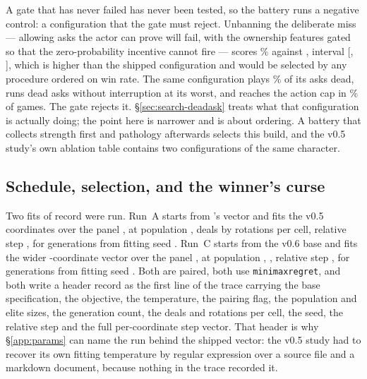 A gate that has never failed has never been tested, so the battery runs a
negative control: a configuration that the gate must reject. Unbanning the
deliberate miss --- allowing asks the actor can prove will fail, with the
ownership features gated so that the zero-probability incentive cannot fire ---
scores \vsixDeadWin{}\% against \vfive{}, interval [\vsixDeadWinLo{},
\vsixDeadWinHi{}], which is higher than the shipped configuration and would be
selected by any procedure ordered on win rate. The same configuration plays
\vsixDeadPathDead{}\% of its asks dead, runs \vsixDeadPathLongest{} dead asks
without interruption at its worst, and reaches the action cap in
\vsixDeadPathLimit{}\% of games. The gate rejects it.
\S\ref{sec:search-deadask} treats what that configuration is actually doing;
the point here is narrower and is about ordering. A battery that collects
strength first and pathology afterwards selects this build, and the v0.5 study's
own ablation table contains two configurations of the same character.

\subsection{Schedule, selection, and the winner's curse}
\label{sec:fit-schedule}

Two fits of record were run. Run~A starts from \vfive{}'s vector and fits the
\numVfiveParams{} v0.5 coordinates over the panel \vsixFitAPanel{}, at population
\vsixFitAPop{}, \vsixFitADeals{} deals by rotations per cell, relative step
\vsixFitASigmaRel{}, for \vsixFitAGens{} generations from fitting seed
\vsixFitASeed{}. Run~C starts from the v0.6 base and fits the wider
\numVsixParams{}-coordinate vector over the panel \vsixFitCPanel{}, at population
\vsixFitCPop{}, \vsixFitCDeals{}, relative step \vsixFitCSigmaRel{}, for
\vsixFitCGens{} generations from fitting seed \vsixFitCSeed{}. Both are paired,
both use \texttt{minimaxregret}, and both write a header record as the first line
of the trace carrying the base specification, the objective, the temperature, the
pairing flag, the population and elite sizes, the generation count, the deals and
rotations per cell, the seed, the relative step and the full per-coordinate step
vector. That header is why \S\ref{app:params} can name the run behind the shipped
vector: the v0.5 study had to recover its own fitting temperature by regular
expression over a source file and a markdown document, because nothing in the
trace recorded it.

